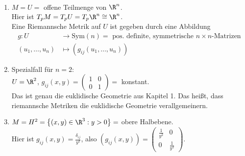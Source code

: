 \begin{example}
  \
  \begin{enumerate}
    \item \( M = U = \) offene Teilmenge von \( \R^n \). \\
      Hier ist \( T_p M = T_p U = T_p \R^n \cong \R^n \). \\
      Eine Riemannsche Metrik auf \( U \) ist gegeben durch eine Abbildung
      \begin{align*}
        g: U &\to \text{Sym}(n) = \text{ pos.\ definite, symmetrische } n \times n \text{-Matrizen} \\
        (u_1, \dots, u_n) &\mapsto (g_{ij}(u_1, \dots, u_n))
      \end{align*}

    \item Spezialfall für \( n = 2 \): \\
      \( U = \R^2 \), \( g_{ij}(x,y) = \left( \begin{smallmatrix}
        1 & 0 \\ 0 & 1
      \end{smallmatrix} \right) = \) konstant. \\
      Das ist genau die euklidische Geometrie aus Kapitel 1. Das heißt, dass riemannsche Metriken die euklidische Geometrie verallgemeinern.

    \item \( M = H^2 = \left \{ (x,y) \in \R^3 : y > 0 \right \} = \) obere Halbebene. \\
      Hier ist \( g_{ij}(x,y) = \frac{\delta_{ij}}{y^2} \), also \( (g_{ij}(x,y)) = \left( \begin{smallmatrix}
        \tfrac{1}{y^2} & 0 \\ 0 & \tfrac{1}{y^2}
      \end{smallmatrix} \right) \).
  \end{enumerate}
\end{example}

